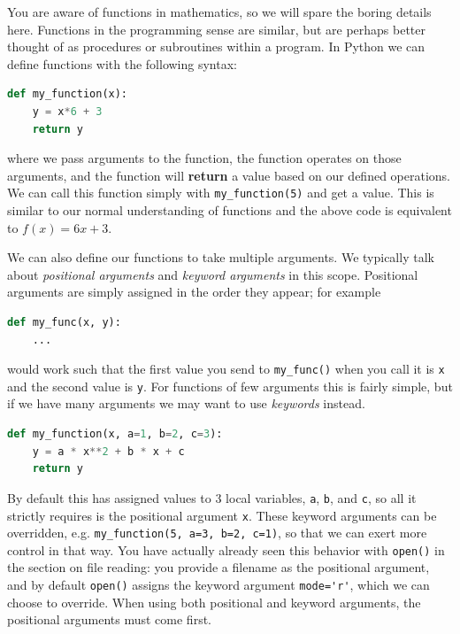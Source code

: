 \documentclass{tufte-book}
\begin{document}

You are aware of functions in mathematics, so we will spare the boring details here. Functions in the programming sense are similar, but are perhaps better thought of as procedures or subroutines within a program. In Python we can define functions with the following syntax:

\begin{lstlisting}[language=Python, showstringspaces=false,backgroundcolor=\color{lightgray}]
def my_function(x):
    y = x*6 + 3
    return y
\end{lstlisting}

\noindent where we pass arguments to the function, the function operates on those arguments, and the function will \textbf{return} a value based on our defined operations. We can call this function simply with \verb|my_function(5)| and get a value. This is similar to our normal understanding of functions and the above code is equivalent to $f(x) = 6x + 3$. 

We can also define our functions to take multiple arguments. We typically talk about \textit{positional arguments} and \textit{keyword arguments} in this scope. Positional arguments are simply assigned in the order they appear; for example 

\begin{lstlisting}[language=Python, showstringspaces=false, backgroundcolor=\color{lightgray}]
    def my_func(x, y):
    ...
\end{lstlisting}
\noindent would work such that the first value you send to \verb|my_func()| when you call it is \verb|x| and the second value is \verb|y|. For functions of few arguments this is fairly simple, but if we have many arguments we may want to use \textit{keywords} instead.

\begin{lstlisting}[language=Python, showstringspaces=false,backgroundcolor=\color{lightgray}]
def my_function(x, a=1, b=2, c=3):
    y = a * x**2 + b * x + c
    return y
\end{lstlisting}

By default this has assigned values to 3 local variables, \verb|a|, \verb|b|, and \verb|c|, so all it strictly requires is the positional argument \verb|x|. These keyword arguments can be overridden, e.g. \verb|my_function(5, a=3, b=2, c=1)|, so that we can exert more control in that way. You have actually already seen this behavior with \verb|open()| in the section on file reading: you provide a filename as the positional argument, and by default \verb|open()| assigns the keyword argument \verb|mode='r'|, which we can choose to override. When using both positional and keyword arguments, the positional arguments must come first.
\end{document}
